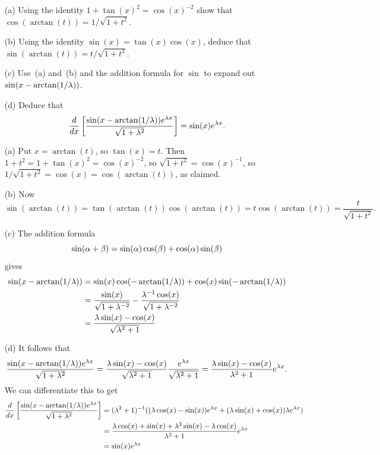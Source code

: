 \documentclass[a4paper]{article}
\begin{document}
\begin{problem}
 \begin{itemize}
  \item[(a)] Using the identity $1+\tan(x)^2=\cos(x)^{-2}$ show that
   $\cos(\arctan(t))=1/\sqrt{1+t^2}$.
  \item[(b)] Using the identity $\sin(x)=\tan(x)\cos(x)$, deduce that
   $\sin(\arctan(t))=t/\sqrt{1+t^2}$.
  \item[(c)] Use~(a) and~(b) and the addition formula for $\sin$ to
   expand out $\sin(x-\arctan(1/\lambda))$.
  \item[(d)] Deduce that
   \[ \frac{d}{dx}
       \left[
        \frac{\sin(x-\arctan(1/\lambda))e^{\lambda x}}{\sqrt{1+\lambda^2}}
       \right] = \sin(x) e^{\lambda x}.
   \]
 \end{itemize}
\end{problem}
\begin{solution}
 \begin{itemize}
  \item[(a)] Put $x=\arctan(t)$, so $\tan(x)=t$.  Then
   $1+t^2=1+\tan(x)^2=\cos(x)^{-2}$, so $\sqrt{1+t^2}=\cos(x)^{-1}$,
   so $1/\sqrt{1+t^2}=\cos(x)=\cos(\arctan(t))$, as claimed.
  \item[(b)] Now 
   \[ \sin(\arctan(t))=\tan(\arctan(t))\cos(\arctan(t))=
       t\cos(\arctan(t))=\frac{t}{\sqrt{1+t^2}}.
   \]
  \item[(c)] The addition formula
   \[ \sin(\alpha+\beta) = \sin(\alpha)\cos(\beta) + \cos(\alpha)\sin(\beta) \]
   gives 
   \begin{align*}
     \sin(x-\arctan(1/\lambda)) &= 
       \sin(x)\cos(-\arctan(1/\lambda)) + 
       \cos(x)\sin(-\arctan(1/\lambda))  \\
       &= \frac{\sin(x)}{\sqrt{1+\lambda^{-2}}} -
          \frac{\lambda^{-1}\cos(x)}{\sqrt{1+\lambda^{-2}}} \\
       &= \frac{\lambda\sin(x)-\cos(x)}{\sqrt{\lambda^2+1}}
   \end{align*}
  \item[(d)] It follows that
   \[ \frac{\sin(x-\arctan(1/\lambda))e^{\lambda x}}{\sqrt{1+\lambda^2}}
       = \frac{\lambda\sin(x)-\cos(x)}{\sqrt{\lambda^2+1}}
         \frac{e^{\lambda x}}{\sqrt{\lambda^2+1}}
       = \frac{\lambda\sin(x)-\cos(x)}{\lambda^2+1}e^{\lambda x}.
   \]
   We can differentiate this to get 
   \begin{align*}
    \frac{d}{dx}
       \left[
        \frac{\sin(x-\arctan(1/\lambda))e^{\lambda x}}{\sqrt{1+\lambda^2}}
       \right] &= (\lambda^2+1)^{-1} ((\lambda\cos(x)-\sin(x))e^{\lambda x} + 
                      (\lambda\sin(x)+\cos(x)) \lambda e^{\lambda x}) \\
       &=
       \frac{\lambda\cos(x)+\sin(x)+\lambda^2\sin(x)-\lambda\cos(x)}{\lambda^2+1}e^{\lambda x} \\
       &= \sin(x)e^{\lambda x}
   \end{align*}
 \end{itemize}
\end{solution}
\end{document}
